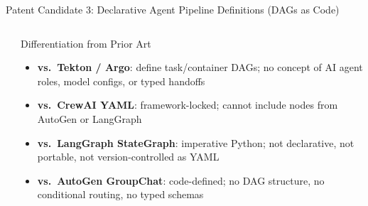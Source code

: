 \begin{frame}{\fontsize{8}{10}\selectfont Patent Candidate 3: Declarative Agent Pipeline Definitions (DAGs as Code)}
\begin{columns}[T]
\begin{center}
    \end{center}

    \vspace{-0.3cm}

    \begin{exampleblock}{\fontsize{5.5}{6.5}\selectfont Differentiation from Prior Art}
      \fontsize{5.5}{6.5}\selectfont
      \begin{itemize}
        \setlength{\itemsep}{0pt}
        \item \textbf{vs.\ Tekton / Argo}: define task/container DAGs; no concept
              of AI agent roles, model configs, or typed handoffs
        \item \textbf{vs.\ CrewAI YAML}: framework-locked; cannot include nodes
              from AutoGen or LangGraph
        \item \textbf{vs.\ LangGraph StateGraph}: imperative Python; not
              declarative, not portable, not version-controlled as YAML
        \item \textbf{vs.\ AutoGen GroupChat}: code-defined; no DAG structure,
              no conditional routing, no typed schemas
      \end{itemize}
    \end{exampleblock}
  \end{columns}
\end{frame}


